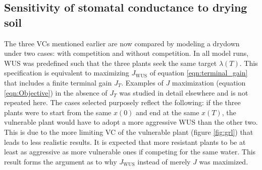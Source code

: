 \documentclass[utf8]{frontiersSCNS} %
\begin{document}



\subsection{Sensitivity of stomatal conductance to drying soil}

The three VCs mentioned earlier are now compared by modeling a drydown under two cases: with competition and without competition. In all model runs, WUS was predefined such that the three plants seek the same target $\lambda(T)$. This specification is equivalent to maximizing $J_{\text{WUS}}$ of equation \ref{eqn:terminal_gain} that includes a finite terminal gain $J_T$. Examples of $J$ maximization (equation \ref{eqn:Objective}) in the absence of $J_T$ was studied in detail elsewhere \citep{manzoni_optimization_2013} and is not repeated here. The cases selected purposely reflect the following: if the three plants were to start from the same $x(0)$ and end at the same $x(T)$, the vulnerable plant would have to adopt a more aggressive WUS than the other two. This is due to the more limiting VC of the vulnerable plant (figure \ref{fig:grl}) that leads to less realistic results. It is expected that more resistant plants to be at least as aggressive as more vulnerable ones if competing for the same water. This result forms the argument as to why $J_{\text{WUS}}$ instead of merely $J$ was maximized.
\end{document}
